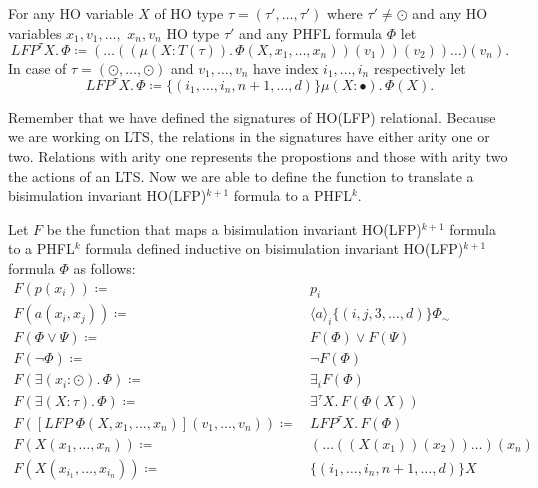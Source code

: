 \begin{definition}
    For any HO variable $X$ of HO type $\tau = (\tau', \dots, \tau')$ where $\tau' \neq \odot$ and any HO variables
    $x_1, v_1, \dots, $ $x_n, v_n$ HO type $\tau'$ and any PHFL formula $\Phi$ let
    \[LFP^\tau X.\,\Phi \coloneqq (\dots ((\mu (X \colon T(\tau)).\,\Phi(X, x_1, \dots, x_n))(v_1))(v_2))\dots)(v_n).\]
    In case of $\tau = (\odot, \dots, \odot)$ and $v_1, \dots, v_n$ have index $i_1, \dots, i_n$ respectively let
    \[LFP^{\tau} X.\,\Phi \coloneqq \{(i_1, \dots, i_n, n + 1, \dots, d)\} \mu (X \colon \bullet).\,\Phi(X).\]
\end{definition}

Remember that we have defined the signatures of HO(LFP) relational. Because we are working on LTS, the relations in
the signatures have either arity one or two. Relations with arity one represents the propostions and those with arity
two the actions of an LTS. Now we are able to define the function to translate a bisimulation invariant HO(LFP)$^{k+1}$
formula to a PHFL$^k$.

\begin{definition}
    \label{definition:lower_bounds_phfl_formula_function}
    Let $F$ be the function that maps a bisimulation invariant HO(LFP)$^{k+1}$ formula to a PHFL$^k$ formula defined
    inductive on bisimulation invariant HO(LFP)$^{k+1}$ formula $\Phi$ as follows:
    \begin{align*}
        F(p(x_i)) \coloneqq &\, p_i \\
        F(a(x_i, x_j)) \coloneqq &\, \langle a \rangle_i \{(i, j, 3, \dots, d)\} \Phi_\sim \\
        F(\Phi \vee \Psi) \coloneqq &\, F(\Phi) \vee F(\Psi) \\
        F(\neg \Phi) \coloneqq &\, \neg F(\Phi) \\
        F(\exists (x_i \colon \odot).\,\Phi) \coloneqq &\, \exists_i F(\Phi) \\
        F(\exists (X \colon \tau).\,\Phi) \coloneqq &\, \exists^\tau X.\,F(\Phi(X)) \\
        F([LFP\;\Phi(X, x_1, \dots, x_n)](v_1, \dots, v_n)) \coloneqq &\,LFP^\tau X.\, F(\Phi) \\
        F(X(x_1, \dots, x_n)) \coloneqq &\, (\dots ((X(x_1))(x_2))\dots)(x_n)\\
        F(X(x_{i_1}, \dots, x_{i_n})) \coloneqq &\, \{(i_1, \dots, i_n, n + 1, \dots, d)\}X
    \end{align*}
\end{definition}

